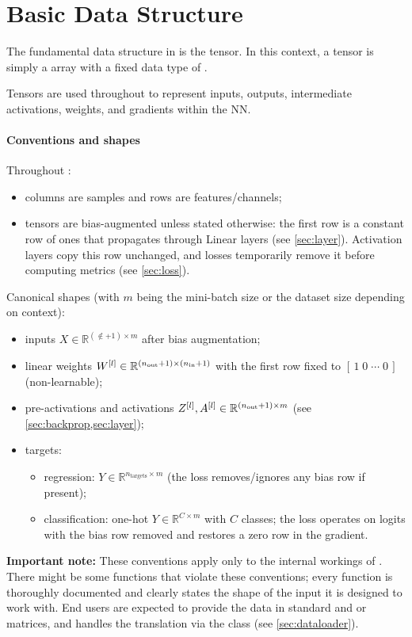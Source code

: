 \section{Basic Data Structure} \label{sec:tensor}

The fundamental data structure in \mfnet is the tensor. In this context, a tensor is simply a  array with a fixed data type of . 

Tensors are used throughout \mfnet to represent inputs, outputs, intermediate activations, weights, and gradients within the \acl{NN}.

\paragraph{Conventions and shapes} Throughout \mfnet:
\begin{itemize}
    \item columns are samples and rows are features/channels;
    \item tensors are bias-augmented unless stated otherwise: the first row is a constant row of ones that propagates through Linear layers (see \cref{sec:layer}). Activation layers copy this row unchanged, and losses temporarily remove it before computing metrics (see \cref{sec:loss}).
\end{itemize}

Canonical shapes (with $m$ being the mini-batch size or the dataset size depending on context):
\begin{itemize}
    \item inputs $X \in \mathbb{R}^{(\nin+1)\times m}$ after bias augmentation;
    \item linear weights $W^{[l]} \in \mathbb{R}^{(n_\text{out}+1)\times(n_\text{in}+1)}$ with the first row fixed to $[\,1\;0\;\cdots\;0\,]$ (non-learnable);
    \item pre-activations and activations $Z^{[l]}, A^{[l]} \in \mathbb{R}^{(n_\text{out}+1)\times m}$ (see \cref{sec:backprop,sec:layer});
    \item targets:
    \begin{itemize}
        \item regression: $Y \in \mathbb{R}^{n_\text{targets}\times m}$ (the loss removes/ignores any bias row if present);
        \item classification: one-hot $Y \in \mathbb{R}^{C\times m}$ with $C$ classes; the loss operates on logits with the bias row removed and restores a zero row in the gradient.
    \end{itemize}
\end{itemize}

\textbf{Important note:} These conventions apply only to the internal workings of \mfnet. There might be some functions that violate these conventions; every function is thoroughly documented and clearly states the shape of the input it is designed to work with. End users are expected to provide the data in standard  and  or  matrices, and \mfnet handles the translation via the  class (see \cref{sec:dataloader}).
